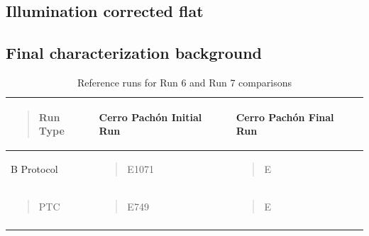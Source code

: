 \subsection{Illumination corrected flat}


\subsection{Final characterization background}\label{final_background}

\begin{longtable}[H]{@{}
  >{\raggedright\arraybackslash}p{}
  >{\raggedright\arraybackslash}p{}
  >{\raggedright\arraybackslash}p{}@{}}
\toprule\noalign{}
\label{runTable}
\begin{minipage}[b]{\linewidth}\raggedright
\begin{quote}
Run Type
\end{quote}
\end{minipage} & \begin{minipage}[b]{\linewidth}\raggedright
Cerro Pachón Initial Run
\end{minipage} & \begin{minipage}[b]{\linewidth}\raggedright
Cerro Pachón Final Run
\end{minipage} \\
\midrule\noalign{}
\endhead
\bottomrule\noalign{}
\endlastfoot
B Protocol & \begin{minipage}[t]{\linewidth}\raggedright
\begin{quote}
E1071
\end{quote}
\end{minipage} & \begin{minipage}[t]{\linewidth}\raggedright
\begin{quote}
E
\end{quote}
\end{minipage} \\
\begin{minipage}[t]{\linewidth}\raggedright
\begin{quote}
PTC
\end{quote}
\end{minipage} & \begin{minipage}[t]{\linewidth}\raggedright
\begin{quote}
E749
\end{quote}
\end{minipage} & \begin{minipage}[t]{\linewidth}\raggedright
\begin{quote}
E
\end{quote}
\end{minipage} \\
\caption{Reference runs for Run 6 and Run 7 comparisons}
\end{longtable}

